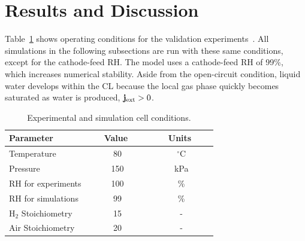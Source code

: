 \documentclass[final,3p,times,twocolumn]{elsarticle}    %
\newcommand{\crr}[1]{\color{red} #1 \color{black}}
\begin{document}
\section{Results and Discussion}
\crr{Table~\ref{tab:conditions} shows operating conditions for the validation experiments~\cite{bib:owejan_2013}. All simulations in the following subsections are run with these same conditions, except for the cathode-feed RH. The model uses a cathode-feed RH of 99\%, which increases numerical stability. Aside from the open-circuit condition, liquid water develops within the CL because the local gas phase quickly becomes saturated as water is produced, $\mathbf{j}_{\rm ext} > 0$.}

\begin{table}[!htb]
    \crr{
    \small
    \centering
    \caption{Experimental and simulation cell conditions.}
    \vspace*{1mm}
    
    \begin{tabular}{l c c}
    \hline \hline 
    Parameter         &\ \ \ Value \ \ \  &\ \ \ Units \ \ \ \\
    \hline
    Temperature             &80                 &$^{\circ}$C \\
    Pressure                &150                &kPa \\
    RH for experiments      &100                &\% \\
    RH for simulations      &99                 &\% \\
    H$_2$ Stoichiometry     &15                 &- \\
    Air Stoichiometry       &20                 &- \\
    \hline \hline
    \end{tabular}
    \label{tab:conditions}
    }
\end{table}
\end{document}
